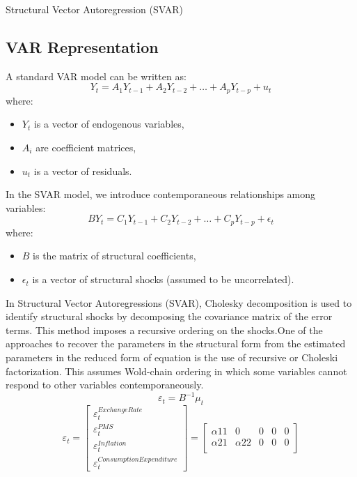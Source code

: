 \documentclass{beamer}
\begin{document}
{\begin{frame}{Structural Vector Autoregression (SVAR)}
\subsection*{VAR Representation}
A standard VAR model can be written as:
\begin{equation}
Y_t = A_1 Y_{t-1} + A_2 Y_{t-2} + \dots + A_p Y_{t-p} + u_t
\end{equation}
where:
\begin{itemize}
    \item \( Y_t \) is a vector of endogenous variables,
    \item \( A_i \) are coefficient matrices,
    \item \( u_t \) is a vector of residuals.
\end{itemize}
In the SVAR model, we introduce contemporaneous relationships among variables:
\begin{equation}
B Y_t = C_1 Y_{t-1} + C_2 Y_{t-2} + \dots + C_p Y_{t-p} + \epsilon_t
\end{equation}
where:
\begin{itemize}
    \item \( B \) is the matrix of structural coefficients,
    \item \( \epsilon_t \) is a vector of structural shocks (assumed to be uncorrelated).
\end{itemize}
\end{frame}
\begin{frame}
In Structural Vector Autoregressions (SVAR), Cholesky decomposition is used to identify structural shocks by decomposing the covariance matrix of the error terms. This method imposes a recursive ordering on the shocks.One of the approaches to recover the parameters in the structural form from the estimated parameters in the reduced form of equation is the use of recursive or Choleski factorization. This assumes Wold-chain ordering in which some variables cannot respond to other variables contemporaneously.
$$\varepsilon_t= B^{-1} \mu_t$$
\begin{equation}
\varepsilon_t = 
\begin{bmatrix}
\varepsilon_t^{Exchange Rate}\\
\varepsilon_t^{PMS}\\
\varepsilon_t^{Inflation}\\
\varepsilon_t^{Consumption Expenditure}
\end{bmatrix} =
\begin{bmatrix}
\alpha11 &0&0&0&0\\
\alpha21 &\alpha22&0&0&0\\

\end{bmatrix}
\end{equation}
\end{frame}}
\end{document}
